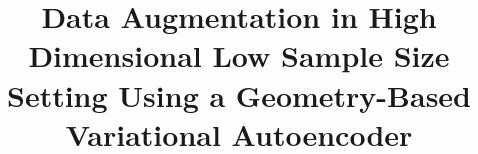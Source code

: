 \documentclass[10pt,journal,compsoc]{IEEEtran}
\begin{document}
%
\title{Data Augmentation in High Dimensional Low Sample Size Setting Using a Geometry-Based Variational Autoencoder}
%
%
%
%
\end{document}
